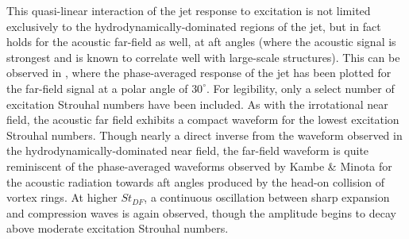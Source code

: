 This quasi-linear interaction of the jet response to excitation is not limited exclusively to the hydrodynamically-dominated regions of the jet, but in fact holds for the acoustic far-field as well, at aft angles (where the acoustic signal is strongest and is known to correlate well with large-scale structures). 
This can be observed in , where the phase-averaged response of the jet has been plotted for the far-field signal at a polar angle of $30^\circ$. 
For legibility, only a select number of excitation Strouhal numbers have been included. 
As with the irrotational near field, the acoustic far field exhibits a compact waveform for the lowest excitation Strouhal numbers. 
Though nearly a direct inverse from the waveform observed in the hydrodynamically-dominated near field, the far-field waveform is quite reminiscent of the phase-averaged waveforms observed by Kambe \& Minota \citep{Kambe1983} for the acoustic radiation towards aft angles produced by the head-on collision of vortex rings. 
At higher $St_{DF}$, a continuous oscillation between sharp expansion and compression waves is again observed, though the amplitude begins to decay above moderate excitation Strouhal numbers. 

